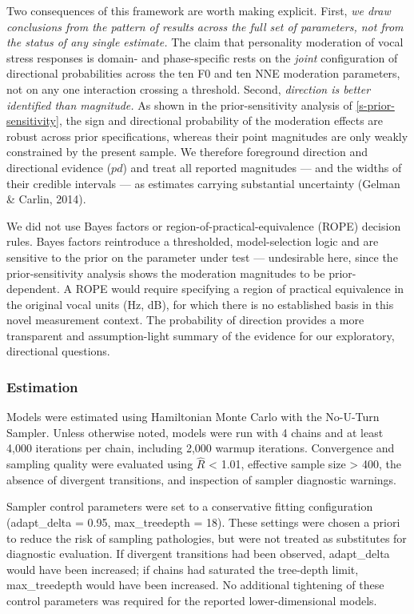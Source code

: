 \documentclass[
  english,
  man,floatsintext]{apa6}
\begin{document}
Two consequences of this framework are worth making explicit. First, \emph{we draw conclusions
from the pattern of results across the full set of parameters, not from the status of any
single estimate.} The claim that personality moderation of vocal stress responses is
domain- and phase-specific rests on the \emph{joint} configuration of directional probabilities
across the ten F0 and ten NNE moderation parameters, not on any one interaction crossing a
threshold. Second, \emph{direction is better identified than magnitude.} As shown in the prior-sensitivity analysis of \ref{s-prior-sensitivity}, the sign and
directional probability of the moderation effects are robust across prior specifications,
whereas their point magnitudes are only weakly constrained by the present sample. We
therefore foreground direction and directional evidence (\(pd\)) and treat all reported
magnitudes --- and the widths of their credible intervals --- as estimates carrying
substantial uncertainty (Gelman \& Carlin, 2014).

We did not use Bayes factors or region-of-practical-equivalence (ROPE) decision rules.
Bayes factors reintroduce a thresholded, model-selection logic and are sensitive to the
prior on the parameter under test --- undesirable here, since the prior-sensitivity analysis
shows the moderation magnitudes to be prior-dependent. A ROPE would require specifying a
region of practical equivalence in the original vocal units (Hz, dB), for which there is no
established basis in this novel measurement context. The probability of direction provides
a more transparent and assumption-light summary of the evidence for our exploratory,
directional questions.

\subsubsection{Estimation}\label{estimation}

Models were estimated using Hamiltonian Monte Carlo with the No-U-Turn Sampler. Unless otherwise noted, models were run with 4 chains and at least 4,000 iterations per chain, including 2,000 warmup iterations. Convergence and sampling quality were evaluated using \(\hat{R}\) \textless{} 1.01, effective sample size \textgreater{} 400, the absence of divergent transitions, and inspection of sampler diagnostic warnings.

Sampler control parameters were set to a conservative fitting configuration (adapt\_delta = 0.95, max\_treedepth = 18). These settings were chosen a priori to reduce the risk of sampling pathologies, but were not treated as substitutes for diagnostic evaluation. If divergent transitions had been observed, adapt\_delta would have been increased; if chains had saturated the tree-depth limit, max\_treedepth would have been increased. No additional tightening of these control parameters was required for the reported lower-dimensional models.
\end{document}
